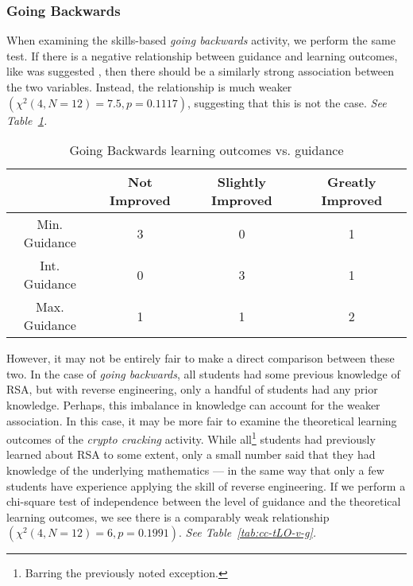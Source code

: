         \subsubsection*{Going Backwards}
            When examining the skills-based \emph{going backwards} activity, we perform the same test. 
            If there is a negative relationship between guidance and learning outcomes, like was suggested \cite{R-Weiss}, then there should be a similarly strong association between the two variables. 
            Instead, the relationship is much weaker $(\chi^2(4, N=12)=7.5,  p = 0.1117)$, suggesting that this is not the case. 
            \emph{See Table~\ref{tab:gb-LO-v-g}.} 

            \begin{table}
            \begin{center}
                \begin{tabular}{|c|c|c|c|}
                    \hline
                        & Not Improved & Slightly Improved & Greatly Improved \\
                    \hline
                    Min. Guidance & 3 & 0 & 1\\
                    \hline
                    Int. Guidance & 0 & 3 & 1\\
                    \hline
                    Max. Guidance & 1 & 1 & 2\\
                    \hline
                \end{tabular}

                \caption{Going Backwards learning outcomes vs. guidance}\label{tab:gb-LO-v-g}
            \end{center}
            \end{table}

        However, it may not be entirely fair to make a direct comparison between these two. 
        In the case of \emph{going backwards}, all students had some previous knowledge of RSA, but with reverse engineering, only a handful of students had any prior knowledge. 
        Perhaps, this imbalance in knowledge can account for the weaker association. 
        In this case, it may be more fair to examine the theoretical learning outcomes of the \emph{crypto cracking} activity. 
        While all\footnote{Barring the previously noted exception.} students had previously learned about RSA to some extent, only a small number said that they had knowledge of the underlying mathematics ---
        in the same way that only a few students have experience applying the skill of reverse engineering. 
        If we perform a chi-square test of independence between the level of guidance and the theoretical learning outcomes, we see there is a comparably weak relationship $(\chi^2(4, N=12)=6,  p = 0.1991)$. 
        \emph{See Table~\ref{tab:cc-tLO-v-g}.}

